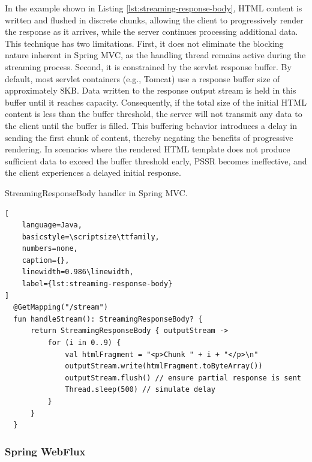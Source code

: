 \documentclass[software,article,accept,pdftex,moreauthors]{Definitions/mdpi}
\begin{document}
In the example shown in Listing \ref{lst:streaming-response-body}, HTML content is
written and flushed in discrete chunks, allowing the client to progressively
render the response as it arrives, while the server continues processing
additional data. This technique has two limitations. First, it does
not eliminate the blocking nature inherent in Spring MVC, as the handling
thread remains active during the streaming process. Second, it is constrained
by the servlet response buffer. By default, most servlet containers (e.g.,
Tomcat) use a response buffer size of approximately 8KB. Data written to the
response output stream is held in this buffer until it reaches capacity.
Consequently, if the total size of the initial HTML content is less than the
buffer threshold, the server will not transmit any data to the client until the
buffer is filled. This buffering behavior introduces a delay in sending the
first chunk of content, thereby negating the benefits of progressive rendering.
In scenarios where the rendered HTML template does not produce sufficient data
to exceed the buffer threshold early, PSSR becomes ineffective, and the client
experiences a delayed initial response.

\begin{listing}[H]
\caption{StreamingResponseBody handler in Spring MVC.}
\begin{lstlisting}[
    language=Java,
    basicstyle=\scriptsize\ttfamily,
    numbers=none,
    caption={},
    linewidth=0.986\linewidth,
    label={lst:streaming-response-body}
]
  @GetMapping("/stream")
  fun handleStream(): StreamingResponseBody? {
      return StreamingResponseBody { outputStream ->
          for (i in 0..9) {
              val htmlFragment = "<p>Chunk " + i + "</p>\n"
              outputStream.write(htmlFragment.toByteArray())
              outputStream.flush() // ensure partial response is sent
              Thread.sleep(500) // simulate delay
          }
      }
  }
\end{lstlisting}
\end{listing}

\subsubsection{Spring WebFlux}
\end{document}
